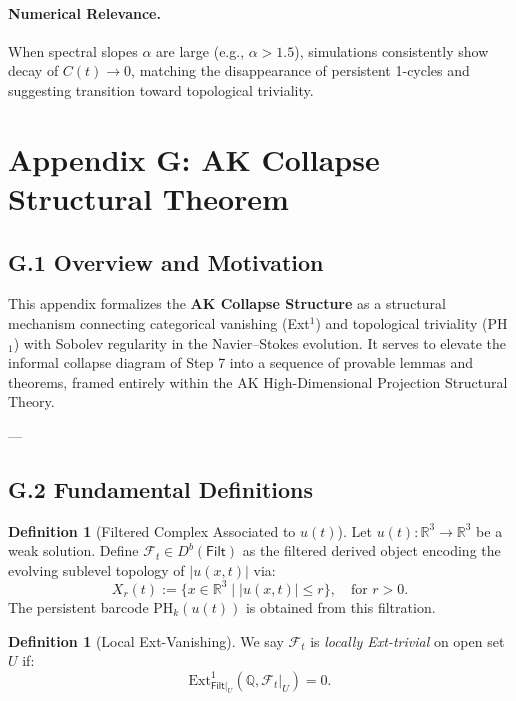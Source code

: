 \documentclass[11pt]{article}
\theoremstyle{definition}
\newtheorem{definition}[theorem]{Definition}
\begin{document}
\paragraph{Numerical Relevance.} When spectral slopes \( \alpha \) are large (e.g., \( \alpha > 1.5 \)), simulations consistently show decay of \( C(t) \to 0 \), matching the disappearance of persistent 1-cycles and suggesting transition toward topological triviality.



\section*{Appendix G: AK Collapse Structural Theorem}

\subsection*{G.1 Overview and Motivation}

This appendix formalizes the \textbf{AK Collapse Structure} as a structural mechanism connecting categorical vanishing (Ext$^1$) and topological triviality (PH$_1$) with Sobolev regularity in the Navier–Stokes evolution.  
It serves to elevate the informal collapse diagram of Step 7 into a sequence of provable lemmas and theorems, framed entirely within the AK High-Dimensional Projection Structural Theory.

---

\subsection*{G.2 Fundamental Definitions}

\begin{definition}[Filtered Complex Associated to $u(t)$]
Let $u(t): \mathbb{R}^3 \to \mathbb{R}^3$ be a weak solution.  
Define $\mathcal{F}_t \in D^b(\mathsf{Filt})$ as the filtered derived object encoding the evolving sublevel topology of $|u(x,t)|$ via:
\[
X_r(t) := \{ x \in \mathbb{R}^3 \mid |u(x,t)| \leq r \}, \quad \text{for } r > 0.
\]
The persistent barcode $\mathrm{PH}_k(u(t))$ is obtained from this filtration.
\end{definition}

\begin{definition}[Local Ext-Vanishing]
We say $\mathcal{F}_t$ is \emph{locally Ext-trivial} on open set $U$ if:
\[
\mathrm{Ext}^1_{\mathsf{Filt}|_U}(\mathbb{Q}, \mathcal{F}_t|_U) = 0.
\]
\end{definition}
\end{document}
